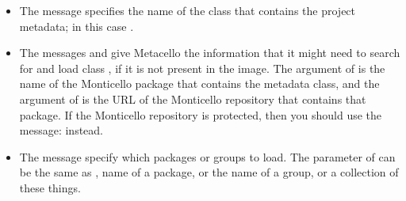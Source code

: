 \documentclass[a4paper,10pt,twoside]{book}
\begin{document}
\begin{itemize}
\item The message  specifies the name of the class that contains the project metadata; in this case .

\item The messages  and  give Metacello the information  that it might need to search for and load class , if it is not present in the image.  The argument of  is the name of the Monticello package that contains the metadata class, and the argument of  is the URL of the Monticello repository that contains that package.
If the Monticello repository is protected, then you should use the message:  instead.

\item The message  specify which packages or groups to load.  The parameter of  can be the same as , \ie name of a package, or the name of a group, or a collection of these things. %


\end{itemize}

\end{document}
